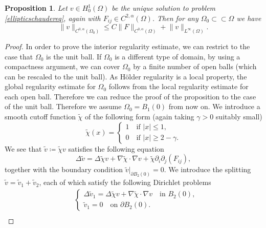 \documentclass[12pt,a4paper]{article}
\newtheorem{proposition}[theorem]{Proposition}
\theoremstyle{definition}
\theoremstyle{remark}
\numberwithin{equation}{section}
\begin{document}
\begin{appendices}
\begin{proposition}
Let $v \in H^1_0 (\Omega)$ be the unique solution to problem \eqref{ellipticschaudereq}, again with $F_{ij} \in C^{2,\alpha} (\Omega)$. Then for any $\Omega_0 \subset \subset \Omega$ we have 
\begin{equation}
\lVert v \rVert_{C^{0,\alpha} (\Omega_0)} \leq C \lVert F \rVert_{C^{0,\alpha} (\Omega)} + \lVert v \rVert_{L^\infty (\Omega)}. \label{interiorschauderestimate}
\end{equation}
\end{proposition}
\begin{proof}
In order to prove the interior regularity estimate, we can restrict to the case that $\Omega_0$ is the unit ball. If $\Omega_0$ is a different type of domain, by using a compactness argument, we can cover $\Omega_0$ by a finite number of open balls (which can be rescaled to the unit ball). As Hölder regularity is a local property, the global regularity estimate for $\Omega_0$ follows from the local regularity estimate for each open ball. Therefore we can reduce the proof of the proposition to the case of the unit ball. Therefore we assume $\Omega_0 = B_1 (0)$ from now on. We introduce a smooth cutoff function $\widetilde{\chi}$ of the following form (again taking $\gamma > 0$ suitably small)
\begin{equation*}
\widetilde{\chi} (x) = \begin{cases}
1 \quad \text{if } \lvert x \rvert \leq 1, \\
0 \quad \text{if } \lvert x \rvert \geq 2 - \gamma.
\end{cases}
\end{equation*}
We see that $\widetilde{v} \coloneqq \widetilde{\chi} v$ satisfies the following equation
\begin{equation*}
\Delta \widetilde{v} = \Delta \widetilde{\chi} v + \nabla \widetilde{\chi} \cdot \nabla v + \widetilde{\chi} \partial_i \partial_j (F_{ij}),
\end{equation*}
together with the boundary condition $\widetilde{v} \lvert_{\partial B_2 (0)} = 0$. We introduce the splitting $\widetilde{v} = \widetilde{v}_1 + \widetilde{v}_2$, each of which satisfy the following Dirichlet problems
\begin{align*}
&\begin{cases}
\Delta \widetilde{v}_1 = \Delta \widetilde{\chi} v + \nabla \widetilde{\chi} \cdot \nabla v \quad \text{in } B_2 (0), \\
\widetilde{v}_1 = 0 \quad \text{on } \partial B_2 (0).
\end{cases} \\

\end{align*}
\end{proof}
\end{appendices}
\end{document}
